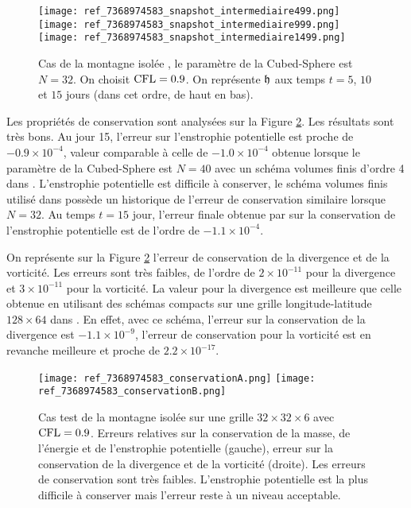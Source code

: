 \begin{figure}[htbp]
\begin{center}
\texttt{[image: ref\_7368974583\_snapshot\_intermediaire499.png]}\\
\texttt{[image: ref\_7368974583\_snapshot\_intermediaire999.png]}\\
\texttt{[image: ref\_7368974583\_snapshot\_intermediaire1499.png]}
\end{center}
\caption{Cas de la montagne isolée \cite{Williamson1992}, le paramètre de la Cubed-Sphere est $N=32$. On choisit $\text{CFL}=0.9$.  On représente $\mathfrak{h}$ aux temps $t=5$, $10$ et $15$ jours (dans cet ordre, de haut en bas).}
\label{fig: williamson 5 space height}
\end{figure}

Les propriétés de conservation sont analysées sur la Figure \ref{fig: williamson 5 conservation}. Les résultats sont très bons. Au jour 15, l'erreur sur l'enstrophie potentielle est proche de $-0.9 \times 10^{-4}$, valeur comparable à celle de $-1.0 \times 10^{-4}$ obtenue lorsque le paramètre de la Cubed-Sphere est $N=40$ avec un schéma volumes finis d'ordre 4 dans \cite{Ullrich2010}. L'enstrophie potentielle est difficile à conserver, le schéma volumes finis utilisé dans \cite{Chen2008} possède un historique de l'erreur de conservation similaire lorsque $N=32$. Au temps $t=15$ jour, l'erreur finale obtenue par \cite{Chen2008} sur la conservation de l'enstrophie potentielle est de l'ordre de $-1.1 \times 10^{-4}$.

On représente sur la Figure \ref{fig: williamson 5 conservation} l'erreur de conservation de la divergence et de la vorticité. Les erreurs sont très faibles, de l'ordre de $2 \times 10^{-11}$ pour la divergence et $3 \times 10^{-11}$ pour la vorticité. La valeur pour la divergence est meilleure que celle obtenue en utilisant des schémas compacts sur une grille longitude-latitude $128 \times 64$ dans \cite{Nihei2003}. En effet, avec ce schéma, l'erreur sur la conservation de la divergence est $-1.1 \times 10^{-9}$, l'erreur de conservation pour la vorticité est en revanche meilleure et proche de $2.2 \times 10^{-17}$. 

\begin{figure}[htbp]
\begin{center}
\texttt{[image: ref\_7368974583\_conservationA.png]}
\texttt{[image: ref\_7368974583\_conservationB.png]}
\end{center}
\caption{Cas test de la montagne isolée \cite{Williamson1992} sur une grille $32 \times 32 \times 6$ avec $\text{CFL}=0.9$. Erreurs relatives sur la conservation de la masse, de l'énergie et de l'enstrophie potentielle (gauche), erreur sur la conservation de la divergence et de la vorticité (droite). Les erreurs de conservation sont très faibles. L'enstrophie potentielle est la plus difficile à conserver mais l'erreur reste à un niveau acceptable.}
\label{fig: williamson 5 conservation}
\end{figure}

